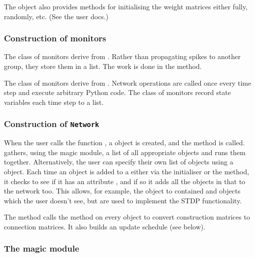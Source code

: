 \documentclass[letterpaper,10pt,english]{manual}
\begin{document}
The  object also provides methods for initialising the weight
matrices either fully, randomly, etc. (See the user docs.)


\subsubsection{Construction of monitors}

The  class of monitors derive from .
Rather than propagating spikes to another group, they store them in a list. The
work is done in the  method.

The  class of monitors derive from .
Network operations are called once every time step and execute arbitrary Python
code. The  class of monitors record state variables each
time step to a list.


\subsubsection{Construction of \texttt{Network}}

When the user calls the function , a  object is
created, and the  method is called. 
gathers, using the magic module, a list of all appropriate objects and runs them
together. Alternatively, the user can specify their own list of objects using
a  object. Each time an object is added to a 
either via the initialiser or the  method, it checks to see
if it has an attribute , and if so it adds all the objects
in that to the network too. This allows, for example, the  object
to contained  and  objects which the user
doesn't see, but are used to implement the STDP functionality.

The  method calls the  method
on every  object to convert construction matrices to
connection matrices. It also builds an update schedule (see below).


\subsubsection{The magic module}
\end{document}
